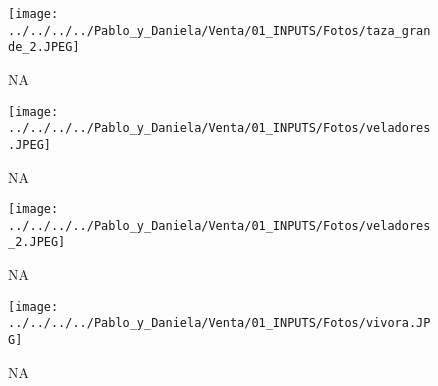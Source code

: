 \documentclass[
]{article}
\begin{document}
\pagebreak

\begin{figure}
\centering
\texttt{[image: ../../../../Pablo\_y\_Daniela/Venta/01\_INPUTS/Fotos/taza\_grande\_2.JPEG]}
\caption{NA}
\end{figure}

\pagebreak

\begin{figure}
\centering
\texttt{[image: ../../../../Pablo\_y\_Daniela/Venta/01\_INPUTS/Fotos/veladores.JPEG]}
\caption{NA}
\end{figure}

\pagebreak

\begin{figure}
\centering
\texttt{[image: ../../../../Pablo\_y\_Daniela/Venta/01\_INPUTS/Fotos/veladores\_2.JPEG]}
\caption{NA}
\end{figure}

\pagebreak

\begin{figure}
\centering
\texttt{[image: ../../../../Pablo\_y\_Daniela/Venta/01\_INPUTS/Fotos/vivora.JPG]}
\caption{NA}
\end{figure}

\pagebreak
\end{document}
